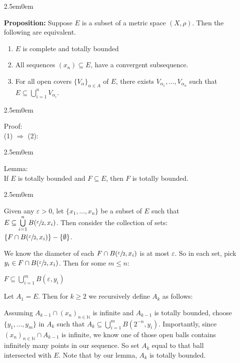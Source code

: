 \documentclass{book}
\newcommand{\hTwo}{%
\color{MidnightBlue}%
   \fontsize{13}{15}\selectfont%
}
\newcommand{\hThree}{%
   \color{PineGreen!85!Orange}
   \fontsize{12}{14}\selectfont%
}
\newcommand{\hFour}{%
   \color{Cyan}
   \fontsize{12}{14}\selectfont%
}
\newenvironment{myIndent}{%
   \begin{adjustwidth}{2.5em}{0em}%
}{%
   \end{adjustwidth}%
}
\newcommand{\blab}[1]{\textbf{#1}}
\newcommand{\retTwo}{\hfill\bigbreak}
\begin{document}
\begin{myIndent}\hTwo
   \blab{Proposition:} Suppose $E$ is a subset of a metric space $(X, \rho)$. Then the following are equivalent.
   
   \begin{enumerate}
      \item $E$ is complete and totally bounded
      \item All sequences $(x_n) \subseteq E$, have a convergent subsequence.
      \item For all open covers $\{V_\alpha\}_{\alpha \in A}$ of $E$, there exists $V_{\alpha_1}, \ldots, V_{\alpha_n}$ such that\\ $E \subseteq \bigcup\limits_{i=1}^n V_{\alpha_i}$.\retTwo
   \end{enumerate}
   
   \begin{myIndent}\hThree
      Proof:\\
      (1) $\Longrightarrow$ (2):
      \begin{myIndent}
         Lemma:\\
         If $E$ is totally bounded and $F \subseteq E$, then $F$ is totally bounded.
         \begin{myIndent}\hFour
            Given any $\varepsilon > 0$, let $\{x_1, \ldots, x_n\}$ be a subset of $E$ such that\\ $E \subseteq \bigcup\limits_{i = 1}^n B(\sfrac{\varepsilon}{2}, x_i)$. Then consider the collection of sets:\\ [-8pt] \phantom{aaaaaaaaaaaaaaaaaaaaaaaaaaaaaaa} $\{F \cap B(\sfrac{\varepsilon}{2}, x_i)\} - \{\emptyset\}$.\retTwo

            We know the diameter of each $F \cap B(\sfrac{\varepsilon}{2}, x_i)$ is at most $\varepsilon$. So in each set, pick $y_i \in F \cap B(\sfrac{\varepsilon}{2}, x_i)$. Then for some $m \leq n$:

            {\centering $F \subseteq \bigcup\limits_{i=1}^m B(\varepsilon, y_i)$ \retTwo\par}
         \end{myIndent}

         Let $A_1 = E$. Then for $k \geq 2$ we recursively define $A_k$ as follows:\retTwo
         
         Assuming $A_{k-1} \cap (x_n)_{n\in \mathbb{N}}$ is infinite and $A_{k-1}$ is totally bounded, choose\\ [-2pt] $\{y_1, \ldots, y_m\}$ in $A_k$ such that $A_k \subseteq \bigcup\limits_{i = 1}^m B(2^{-n}, y_i)$. Importantly, since\\ $(x_n)_{n\in \mathbb{N}} \cap A_{k-1}$ is infinite, we know one of those open balls contains\\ [4pt] infinitely many points in our sequence. So set $A_{k}$ equal to that ball\\ [4pt] intersected with $E$. Note that by our lemma, $A_k$ is totally bounded.\newpage


\end{myIndent}
\end{myIndent}
\end{myIndent}
\end{document}
